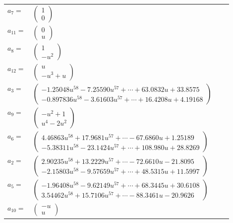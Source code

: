 \documentclass[1p]{elsarticle_modified}
\theoremstyle{definition}
\begin{document}
\begin{tabular}{m{7pt} m{180pt} m{7pt} m{180pt} }
\flushright $a_{7}=$&$\begin{pmatrix}1\\0\end{pmatrix}$ \\
\flushright $a_{11}=$&$\begin{pmatrix}0\\u\end{pmatrix}$ \\
\flushright $a_{8}=$&$\begin{pmatrix}1\\- u^2\end{pmatrix}$ \\
\flushright $a_{12}=$&$\begin{pmatrix}u\\- u^3+u\end{pmatrix}$ \\
\flushright $a_{3}=$&$\begin{pmatrix}-1.25048 u^{58}-7.25590 u^{57}+\cdots+63.0832 u+33.8575\\-0.897836 u^{58}-3.61603 u^{57}+\cdots+16.4208 u+4.19168\end{pmatrix}$ \\
\flushright $a_{9}=$&$\begin{pmatrix}- u^2+1\\u^4-2 u^2\end{pmatrix}$ \\
\flushright $a_{6}=$&$\begin{pmatrix}4.46863 u^{58}+17.9681 u^{57}+\cdots-67.6860 u+1.25189\\-5.38311 u^{58}-23.1424 u^{57}+\cdots+108.980 u+28.8269\end{pmatrix}$ \\
\flushright $a_{2}=$&$\begin{pmatrix}2.90235 u^{58}+13.2229 u^{57}+\cdots-72.6610 u-21.8095\\-2.15803 u^{58}-9.57659 u^{57}+\cdots+48.5315 u+11.5997\end{pmatrix}$ \\
\flushright $a_{5}=$&$\begin{pmatrix}-1.96408 u^{58}-9.62149 u^{57}+\cdots+68.3445 u+30.6108\\3.54462 u^{58}+15.7106 u^{57}+\cdots-88.3461 u-20.9626\end{pmatrix}$ \\
\flushright $a_{10}=$&$\begin{pmatrix}- u\\u\end{pmatrix}$ \\

\end{tabular}
\end{document}
